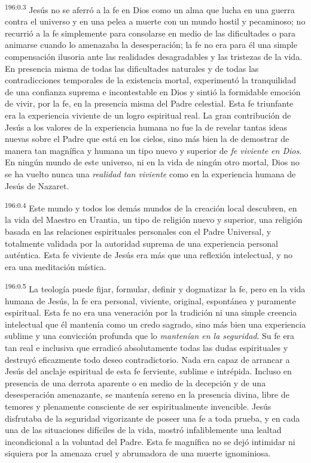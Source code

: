 \par 
\textsuperscript{196:0.3} Jesús no se aferró a la fe en Dios como un alma que lucha en una guerra contra el universo y en una pelea a muerte con un mundo hostil y pecaminoso; no recurrió a la fe simplemente para consolarse en medio de las dificultades o para animarse cuando lo amenazaba la desesperación; la fe no era para él una simple compensación ilusoria ante las realidades desagradables y las tristezas de la vida. En presencia misma de todas las dificultades naturales y de todas las contradicciones temporales de la existencia mortal, experimentó la tranquilidad de una confianza suprema e incontestable en Dios y sintió la formidable emoción de vivir, por la fe, en la presencia misma del Padre celestial. Esta fe triunfante era la experiencia viviente de un logro espiritual real. La gran contribución de Jesús a los valores de la experiencia humana no fue la de revelar tantas ideas nuevas sobre el Padre que está en los cielos, sino más bien la de demostrar de manera tan magnífica y humana un tipo nuevo y superior de \textit{fe viviente en Dios}. En ningún mundo de este universo, ni en la vida de ningún otro mortal, Dios no se ha vuelto nunca una \textit{realidad tan viviente} como en la experiencia humana de Jesús de Nazaret.

\par 
\textsuperscript{196:0.4} Este mundo y todos los demás mundos de la creación local descubren, en la vida del Maestro en Urantia, un tipo de religión nuevo y superior, una religión basada en las relaciones espirituales personales con el Padre Universal, y totalmente validada por la autoridad suprema de una experiencia personal auténtica. Esta fe viviente de Jesús era más que una reflexión intelectual, y no era una meditación mística.

\par 
\textsuperscript{196:0.5} La teología puede fijar, formular, definir y dogmatizar la fe, pero en la vida humana de Jesús, la fe era personal, viviente, original, espontánea y puramente espiritual. Esta fe no era una veneración por la tradición ni una simple creencia intelectual que él mantenía como un credo sagrado, sino más bien una experiencia sublime y una convicción profunda que lo \textit{mantenían en la seguridad}. Su fe era tan real e inclusiva que erradicó absolutamente todas las dudas espirituales y destruyó eficazmente todo deseo contradictorio. Nada era capaz de arrancar a Jesús del anclaje espiritual de esta fe ferviente, sublime e intrépida. Incluso en presencia de una derrota aparente o en medio de la decepción y de una desesperación amenazante, se mantenía sereno en la presencia divina, libre de temores y plenamente consciente de ser espiritualmente invencible. Jesús disfrutaba de la seguridad vigorizante de poseer una fe a toda prueba, y en cada una de las situaciones difíciles de la vida, mostró infaliblemente una lealtad incondicional a la voluntad del Padre. Esta fe magnífica no se dejó intimidar ni siquiera por la amenaza cruel y abrumadora de una muerte ignominiosa.

